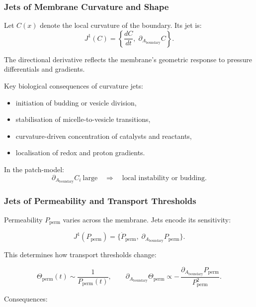 \subsubsection{Jets of Membrane Curvature and Shape}

Let $C(x)$ denote the local curvature of the boundary. Its jet is:
\[
J^1(C)=
\left\{
\frac{dC}{dt},\;
\partial_{A_{\mathrm{boundary}}}C
\right\}.
\]

The directional derivative reflects the membrane's geometric response to
pressure differentials and gradients.

Key biological consequences of curvature jets:

\begin{itemize}
    \item initiation of budding or vesicle division,
    \item stabilisation of micelle-to-vesicle transitions,
    \item curvature-driven concentration of catalysts and reactants,
    \item localisation of redox and proton gradients.
\end{itemize}

In the patch-model:
\[
\partial_{A_{\mathrm{boundary}}}C_i
\ \text{large}
\quad\Rightarrow\quad
\text{local instability or budding}.
\]


\subsubsection{Jets of Permeability and Transport Thresholds}

Permeability $P_{\mathrm{perm}}$ varies across the membrane. Jets encode
its sensitivity:

\[
J^1(P_{\mathrm{perm}})=
\bigl\{
\dot{P}_{\mathrm{perm}},\;
\partial_{A_{\mathrm{boundary}}}P_{\mathrm{perm}}
\bigr\}.
\]

This determines how transport thresholds change:

\[
\Theta_{\mathrm{perm}}(t)
\sim
\frac{1}{P_{\mathrm{perm}}(t)},
\qquad
\partial_{A_{\mathrm{boundary}}}\Theta_{\mathrm{perm}}
\propto
-\,\frac{\partial_{A_{\mathrm{boundary}}}P_{\mathrm{perm}}}{P_{\mathrm{perm}}^2}.
\]

Consequences:

